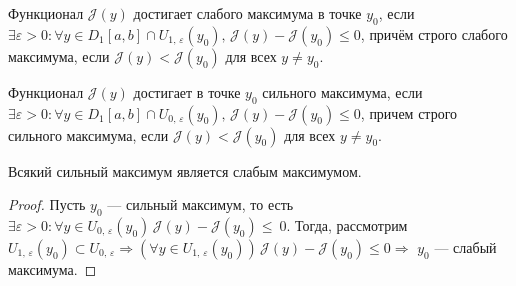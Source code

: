 
\begin{definition}
	Функционал $\mathcal{J}(y)$ достигает слабого максимума в точке $ y_0 $, если $ \exists \varepsilon > 0: \forall y \in D_1[a, b] \cap U_{1, \, \varepsilon}(y_0), \, \mathcal{J}(y) - \mathcal{J}(y_0) \leqslant 0$, причём строго слабого максимума, если $ \mathcal{J}(y) < \mathcal{J}(y_0) $ для всех $ y \not = y_0$.
\end{definition}

\begin{definition}
	Функционал $ \mathcal{J}(y) $ достигает в точке $ y_0 $ сильного максимума, если $ \exists \varepsilon > 0: \forall y \in D_1[a, b] \cap U_{0, \, \varepsilon}(y_0), \, \mathcal{J}(y) - \mathcal{J}(y_0) \leqslant 0 $, причем строго сильного максимума, если $ \mathcal{J}(y) < \mathcal{J}(y_0) $ для всех $ y \not = y_0$.
\end{definition}

\begin{utv}
	Всякий сильный максимум является слабым максимумом.
\end{utv}
\begin{proof}
	Пусть $ y_0 $ --- сильный максимум, то есть $ \exists \varepsilon > 0: \forall y \in U_{0, \, \varepsilon}(y_0) \, \mathcal{J}(y) - \mathcal{J}(y_0) \leqslant~0$.
	Тогда, рассмотрим $ U_{1, \, \varepsilon}(y_0) \subset U_{0, \, \varepsilon} \Rightarrow (
	\forall y \in U_{1, \, \varepsilon}(y_0)) \, \mathcal{J}(y) - \mathcal{J}(y_0) \leqslant 0 \Rightarrow $ $ y_0 $ --- слабый максимума.  
\end{proof}

